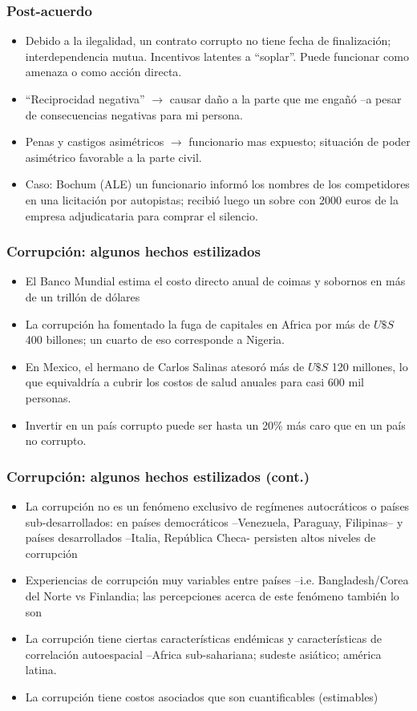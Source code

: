\documentclass[handout,final,xcolor=dvipsnames]{beamer}
\begin{document}
\begin{frame}\frametitle{Post-acuerdo}
\begin{itemize}\itemsep 10pt
\item Debido a la ilegalidad, un contrato corrupto no tiene fecha de
  finalización; interdependencia mutua. Incentivos latentes a
  ``soplar''. Puede funcionar como amenaza o como acción directa. 
\item ``Reciprocidad negativa'' $\longrightarrow$ causar daño a la
  parte que me engañó --a pesar de consecuencias negativas para mi
  persona. 
\item Penas y castigos asimétricos $\longrightarrow$ funcionario mas
  expuesto; situación de poder asimétrico favorable a la parte civil. 
\item Caso: Bochum (ALE) un funcionario informó los nombres de los
  competidores en una licitación por autopistas; recibió luego un
  sobre con 2000 euros de la empresa adjudicataria para comprar el
  silencio.  
\end{itemize}
\end{frame}




\begin{frame}\frametitle{Corrupción: algunos hechos estilizados}
\begin{itemize}\itemsep 10pt
\item El Banco Mundial estima el costo directo anual de coimas y sobornos en más de un
trillón de dólares
\item La corrupción ha fomentado la fuga de capitales en Africa por
  más de $U\$S$ 400 billones; un cuarto de eso corresponde a Nigeria.
\item En Mexico, el hermano de Carlos Salinas atesoró más de $U\$S$
  120 millones, lo que equivaldría a cubrir los costos de salud
  anuales para casi 600 mil personas. 
\item Invertir en un país corrupto puede ser hasta un 20\% más caro
  que en un país no corrupto. 
\end{itemize}
\end{frame} 


\begin{frame}\frametitle{Corrupción: algunos hechos estilizados (cont.)}
\begin{itemize}\itemsep 10pt

\item La corrupción no es un fenómeno exclusivo de regímenes
  autocráticos o países sub-desarrollados: en países democráticos
  --Venezuela, Paraguay, Filipinas-- y países desarrollados --Italia,
  República Checa- persisten altos niveles de corrupción 
\item Experiencias de corrupción muy variables entre países
  --i.e. Bangladesh/Corea del Norte vs Finlandia;
las percepciones acerca de este fenómeno también lo son
\item La corrupción tiene ciertas características endémicas y
  características de correlación autoespacial --Africa sub-sahariana;
  sudeste asiático; américa latina. 
\item La corrupción tiene costos asociados que son cuantificables (estimables)
\end{itemize}
\end{frame}
\end{document}
